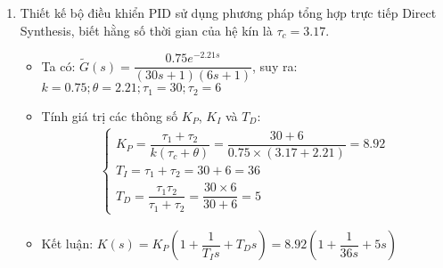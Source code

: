 \begin{solution}
\begin{enumerate}
\begin{enumerate}
            \item Thiết kế bộ điều khiển PID sử dụng phương pháp tổng hợp trực tiếp Direct Synthesis, biết hằng số thời gian của hệ kín là $\tau_c = 3.17$.
                \begin{itemize}
                    \item Ta có: $\tilde{G}(s) = \dfrac{0.75 e^{-2.21 s}}{\left({30s + 1}\right) \left({6s + 1}\right)}$, suy ra: $k = 0.75; \theta = 2.21; \tau_1 = 30; \tau_2 = 6$
                    \item Tính giá trị các thông số $K_P$, $K_I$ và $T_D$:
                        \begin{align*}
                            \left\{\begin{array}{l}
                                K_P = \dfrac{\tau_1 + \tau_2}{k\left({\tau_c + \theta}\right)} = \dfrac{30 + 6}{0.75 \times \left({3.17 + 2.21}\right)} = 8.92\\
                                T_I = \tau_1 + \tau_2 = 30 + 6 = 36\\
                                T_D = \dfrac{\tau_1 \tau_2}{\tau_1 + \tau_2} = \dfrac{30 \times 6}{30 + 6} = 5
                            \end{array}\right.
                        \end{align*}
                    \item Kết luận: $K(s) = K_P \left({1 + \dfrac{1}{T_I s} + T_D s}\right) = 8.92 \left({1 + \dfrac{1}{36s} + 5s}\right)$
                \end{itemize}
        \end{enumerate}
    \end{enumerate}
\end{solution}
